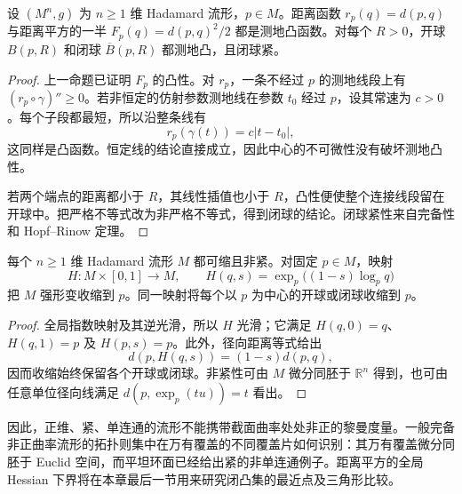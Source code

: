 \begin{corollary}\label{g3:cor:hadamard-distance-balls-convex}
	设 \((M^n,g)\) 为 \(n\ge1\) 维 Hadamard 流形，\(p\in M\)。距离函数 \(r_p(q)=d(p,q)\) 与距离平方的一半 \(F_p(q)=d(p,q)^2/2\) 都是测地凸函数。对每个 \(R>0\)，开球 \(B(p,R)\) 和闭球 \(\overline B(p,R)\) 都测地凸，且闭球紧。
\end{corollary}
\begin{proof}
	上一命题已证明 \(F_p\) 的凸性。对 \(r_p\)，一条不经过 \(p\) 的测地线段上有 \((r_p\circ\gamma)''\ge0\)。若非恒定的仿射参数测地线在参数 \(t_0\) 经过 \(p\)，设其常速为 \(c>0\)。每个子段都最短，所以沿整条线有
	\[
		r_p(\gamma(t))=c|t-t_0|,
	\]
	这同样是凸函数。恒定线的结论直接成立，因此中心的不可微性没有破坏测地凸性。

	若两个端点的距离都小于 \(R\)，其线性插值也小于 \(R\)，凸性便使整个连接线段留在开球中。把严格不等式改为非严格不等式，得到闭球的结论。闭球紧性来自完备性和 Hopf--Rinow 定理。
\end{proof}

\begin{corollary}\label{g3:cor:hadamard-contractible}
	每个 \(n\ge1\) 维 Hadamard 流形 \(M\) 都可缩且非紧。对固定 \(p\in M\)，映射
	\[
		H:M\times[0,1]\longrightarrow M,\qquad
		H(q,s)=\exp_p\bigl((1-s)\log_pq\bigr)
	\]
	把 \(M\) 强形变收缩到 \(p\)。同一映射将每个以 \(p\) 为中心的开球或闭球收缩到 \(p\)。
\end{corollary}
\begin{proof}
	全局指数映射及其逆光滑，所以 \(H\) 光滑；它满足
	\(H(q,0)=q\)、\(H(q,1)=p\) 及 \(H(p,s)=p\)。此外，径向距离等式给出
	\[
		d(p,H(q,s))=(1-s)d(p,q),
	\]
	因而收缩始终保留各个开球或闭球。非紧性可由 \(M\) 微分同胚于 \(\mathbb R^n\) 得到，也可由任意单位径向线满足 \(d(p,\exp_p(tu))=t\) 看出。
\end{proof}

因此，正维、紧、单连通的流形不能携带截面曲率处处非正的黎曼度量。一般完备非正曲率流形的拓扑则集中在万有覆盖的不同覆盖片如何识别：其万有覆盖微分同胚于 Euclid 空间，而平坦环面已经给出紧的非单连通例子。距离平方的全局 Hessian 下界将在本章最后一节用来研究闭凸集的最近点及三角形比较。
